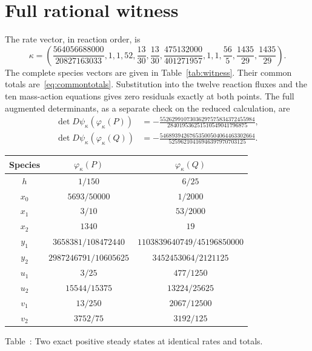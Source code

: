 \documentclass[11pt,a4paper]{article}
\numberwithin{equation}{section}
\theoremstyle{remark}\newtheorem{remark}[theorem]{Remark}
\begin{document}
\section{Full rational witness}\label{app:witness}
The rate vector, in reaction order, is
\[
\kappa=\left(
\frac{564056688000}{20827163033},1,1,52,\frac{13}{30},\frac{13}{30},
\frac{475132000}{401271957},1,1,\frac{56}{5},\frac{1435}{29},\frac{1435}{29}
\right).
\]
The complete species vectors are given in Table~\ref{tab:witness}. Their common totals are~\eqref{eq:commontotals}. Substitution into the twelve reaction fluxes and the ten mass-action equations gives zero residuals exactly at both points. The full augmented determinants, as a separate check on the reduced calculation, are
\begin{align*}
\det D\psi_\kappa(\varphi_\kappa(P))
&=-\frac{55262991073036297575834372455984}{284019536251510549041796875},\\
\det D\psi_\kappa(\varphi_\kappa(Q))
&=-\frac{54689394267653500504064463302664}{52596210416946397970703125}.
\end{align*}
\begin{center}
\begin{minipage}{\textwidth}
\centering
\renewcommand{\arraystretch}{1.1}
\begin{tabular}{@{}ccc@{}}
\toprule
Species & $\varphi_\kappa(P)$ & $\varphi_\kappa(Q)$\\\midrule
$h$ & $1/150$ & $6/25$\\
$x_0$ & $5693/50000$ & $1/2000$\\
$x_1$ & $3/10$ & $53/2000$\\
$x_2$ & $1340$ & $19$\\
$y_1$ & $3658381/108472440$ & $1103839640749/45196850000$\\
$y_2$ & $2987246791/10605625$ & $3452453064/2121125$\\
$u_1$ & $3/25$ & $477/1250$\\
$u_2$ & $15544/15375$ & $13224/25625$\\
$v_1$ & $13/250$ & $2067/12500$\\
$v_2$ & $3752/75$ & $3192/125$\\\bottomrule
\end{tabular}
\par\smallskip{}\label{tab:witness}
Table~\thetable: Two exact positive steady states at identical rates and totals.
\end{minipage}
\end{center}
\end{document}
